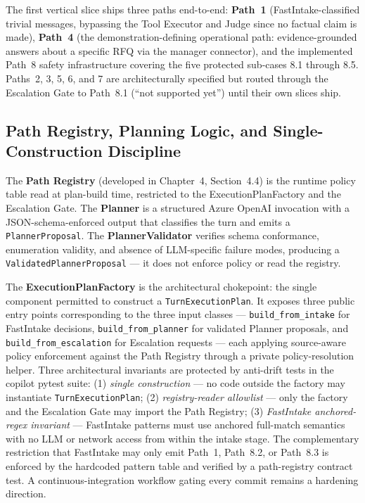 The first vertical slice ships three paths end-to-end: \textbf{Path~1} (FastIntake-classified trivial messages, bypassing the Tool Executor and Judge since no factual claim is made), \textbf{Path~4} (the demonstration-defining operational path: evidence-grounded answers about a specific RFQ via the manager connector), and the implemented Path~8 safety infrastructure covering the five protected sub-cases 8.1 through 8.5. Paths~2, 3, 5, 6, and 7 are architecturally specified but routed through the Escalation Gate to Path~8.1 (``not supported yet'') until their own slices ship.

\subsection{Path Registry, Planning Logic, and Single-Construction Discipline}
The \textbf{Path Registry} (developed in Chapter~4, Section~4.4) is the runtime policy table read at plan-build time, restricted to the ExecutionPlanFactory and the Escalation Gate. The \textbf{Planner} is a structured Azure OpenAI invocation with a JSON-schema-enforced output that classifies the turn and emits a \texttt{PlannerProposal}. The \textbf{PlannerValidator} verifies schema conformance, enumeration validity, and absence of LLM-specific failure modes, producing a \texttt{ValidatedPlannerProposal} --- it does not enforce policy or read the registry.

The \textbf{ExecutionPlanFactory} is the architectural chokepoint: the single component permitted to construct a \texttt{TurnExecutionPlan}. It exposes three public entry points corresponding to the three input classes --- \texttt{build\_from\_intake} for FastIntake decisions, \texttt{build\_from\_planner} for validated Planner proposals, and \texttt{build\_from\_escalation} for Escalation requests --- each applying source-aware policy enforcement against the Path Registry through a private policy-resolution helper. Three architectural invariants are protected by anti-drift tests in the copilot pytest suite: (1) \textit{single construction} --- no code outside the factory may instantiate \texttt{TurnExecutionPlan}; (2) \textit{registry-reader allowlist} --- only the factory and the Escalation Gate may import the Path Registry; (3) \textit{FastIntake anchored-regex invariant} --- FastIntake patterns must use anchored full-match semantics with no LLM or network access from within the intake stage. The complementary restriction that FastIntake may only emit Path~1, Path~8.2, or Path~8.3 is enforced by the hardcoded pattern table and verified by a path-registry contract test. A continuous-integration workflow gating every commit remains a hardening direction.

